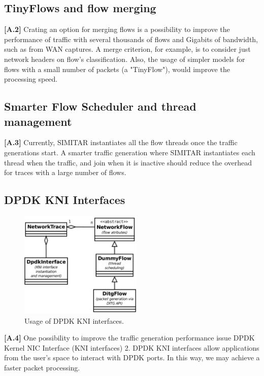 \subsection{TinyFlows and flow merging}

\textbf{[A.2]} Crating an option for merging flows is a possibility to improve the performance of traffic with several thousands of flows and Gigabits of bandwidth, such as from WAN captures. A merge criterion, for example, is to consider just network headers on flow’s classification. Also, the usage of simpler models for flows with a small number of packets (a "TinyFlow"), would improve the processing speed.

\subsection{Smarter Flow Scheduler and thread management}

\textbf{[A.3]} Currently, SIMITAR instantiates all the flow threads once the traffic generations start.  A smarter traffic generation where SIMITAR instantiates each thread when the traffic, and join when it is inactive should reduce the overhead for traces with a large number of flows. 

\subsection{DPDK KNI Interfaces}

\begin{figure}[!ht]
    \centering
    \includegraphics[height=2.0in]{figures/ch6/dpdk-interface.pdf}
    \caption{Usage of DPDK KNI interfaces.}
    \label{fig:dpdk-kni}
\end{figure}

\textbf{[A.4]} One possibility to improve the traffic generation performance issue DPDK Kernel NIC Interface (KNI interfaces) 2. DPDK KNI interfaces allow applications from the user’s space to interact with DPDK ports. In this way, we may achieve a faster packet processing.


